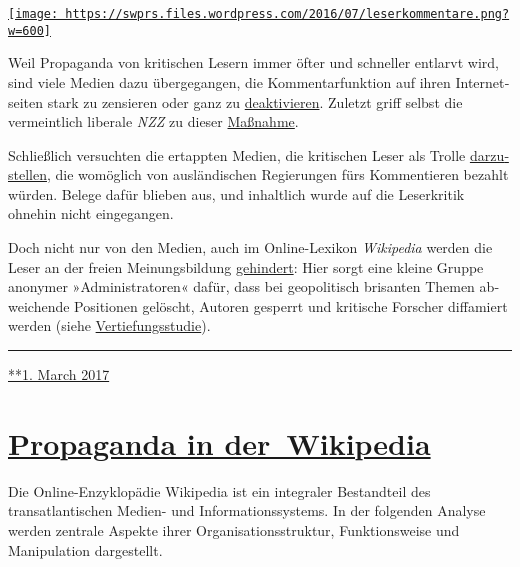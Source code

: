 \href{https://swprs.org/2017/03/01/leserkommentare/}{\texttt{[image: https://swprs.files.wordpress.com/2016/07/leserkommentare.png?w=600]}}

Weil Propaganda von kritischen Lesern immer öfter und schneller entlarvt
wird, sind viele Medien dazu über­ge­gangen, die Kommentar­funktion auf
ihren Inter­net­­seiten stark zu zensieren oder ganz zu
\href{https://www.heise.de/tp/features/Konzentriertes-Gejammer-NZZ-schliesst-Kommentarspalte-3618957.html}{deaktivieren}.
Zuletzt griff selbst die vermeintlich liberale \emph{NZZ} zu dieser
\href{https://www.heise.de/tp/features/Konzentriertes-Gejammer-NZZ-schliesst-Kommentarspalte-3618957.html}{Maßnahme}.

Schließlich versuchten die ertappten Medien, die kri­ti­schen Leser als
Trolle
\href{https://www.nzz.ch/international/putins-internetpiraten-1.18324628}{dar­zu­stellen},
die womöglich von aus­län­dischen Re­gie­rungen fürs Kom­men­tieren
bezahlt würden. Be­lege da­für blie­ben aus, und inhaltlich wurde auf
die Leser­kritik ohnehin nicht ein­ge­gangen.

Doch nicht nur von den Medien, auch im Online-Lexikon \emph{Wikipedia}
werden die Leser an der freien Meinungs­bil­dung
\href{https://swprs.org/propaganda-in-der-wikipedia/}{gehindert}: Hier
sorgt eine kleine Gruppe anonymer »Adminis­tra­toren« dafür, dass bei
geo­po­li­tisch brisanten Themen ab­wei­chende Positionen gelöscht,
Autoren gesperrt und kritische Forscher diffamiert werden (siehe
\href{https://swprs.org/propaganda-in-der-wikipedia/}{Vertiefungsstudie}).

\begin{center}\rule{0.5\linewidth}{\linethickness}\end{center}

\href{https://swprs.org/2017/03/01/leserkommentare/}{**1. March 2017}

\hypertarget{propaganda-in-der-wikipedia}{%
\section{\texorpdfstring{\href{https://swprs.org/2017/03/01/propaganda-in-der-wikipedia/}{Propaganda
in
der~Wikipedia}}{Propaganda in der~Wikipedia}}\label{propaganda-in-der-wikipedia}}

Die Online-Enzyklopädie Wikipedia ist ein integraler Bestandteil des
transatlantischen Medien- und Informationssystems. In der folgenden
Analyse werden zentrale Aspekte ihrer Organisationsstruktur,
Funktionsweise und Manipulation dargestellt.

